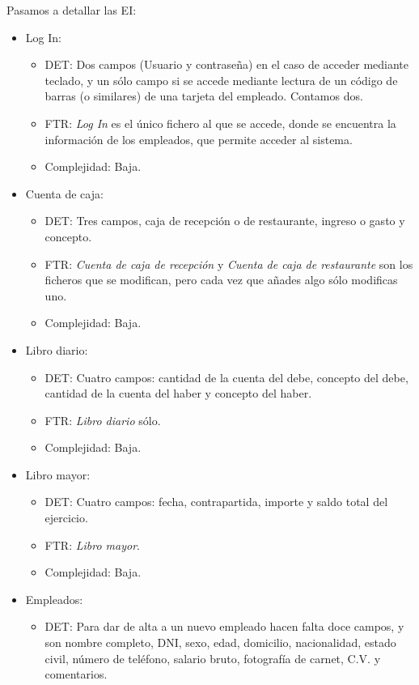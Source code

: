 \documentclass[spanish,a4paper,12pt]{report}	%
\begin{document}
	Pasamos a detallar las EI:
	\begin{itemize}
		\item{Log In:} 
		\begin{itemize}
 			\item{DET:} Dos campos (Usuario y contraseña) en el caso de acceder mediante teclado, y un sólo campo si se accede mediante lectura de un código de barras (o similares) de una tarjeta del empleado. Contamos dos.
			\item{FTR:} \textit{Log In} es el único fichero al que se accede, donde se encuentra la información de los empleados, que permite acceder al sistema.
			\item{Complejidad:} Baja.
		\end{itemize}	
		\item{Cuenta de caja:} 
		\begin{itemize}
 			\item{DET:} Tres campos, caja de recepción o de restaurante, ingreso o gasto y concepto.
			\item{FTR:} \textit{Cuenta de caja de recepción} y \textit{Cuenta de caja de restaurante} son los ficheros que se modifican, pero cada vez que añades algo sólo modificas uno.
			\item{Complejidad:} Baja.
		\end{itemize}
		\item{Libro diario:} 
		\begin{itemize}
 			\item{DET:} Cuatro campos: cantidad de la cuenta del debe, concepto del debe, cantidad de la cuenta del haber y concepto del haber.
			\item{FTR:} \textit{Libro diario} sólo.
			\item{Complejidad:} Baja.
		\end{itemize}
		\item{Libro mayor:} 
		\begin{itemize}
 			\item{DET:} Cuatro campos: fecha, contrapartida, importe y saldo total del ejercicio.
			\item{FTR:} \textit{Libro mayor}.
			\item{Complejidad:} Baja.
		\end{itemize}
		\item{Empleados:} 
		\begin{itemize}
 			\item{DET:} Para dar de alta a un nuevo empleado hacen falta doce campos, y son nombre completo, DNI, sexo, edad, domicilio, nacionalidad, estado civil, número de teléfono, salario bruto, fotografía de carnet, C.V. y comentarios.

\end{itemize}
\end{itemize}
\end{document}
